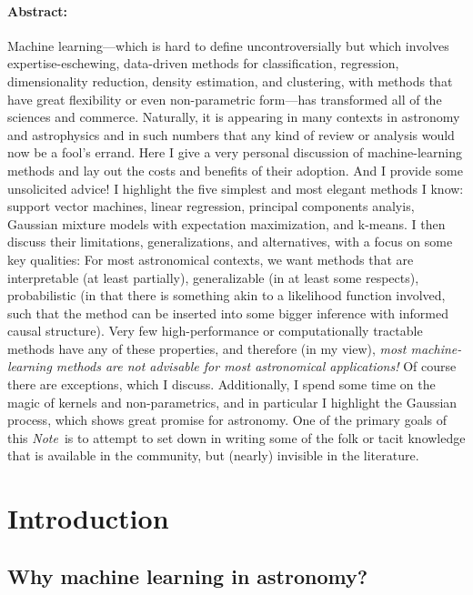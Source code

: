 \documentclass[12pt, twoside, letterpaper]{article}
\newcommand{\documentname}{\textsl{Note}}
\begin{document}
\paragraph{Abstract:}
Machine learning---which is hard to define uncontroversially
but which involves expertise-eschewing, data-driven methods for classification,
regression, dimensionality reduction, density estimation, and clustering,
with methods that have great flexibility or even non-parametric form---has transformed all
of the sciences and commerce.
Naturally, it is appearing in many contexts in astronomy and astrophysics and
in such numbers that any kind of review or analysis would now be a fool's errand.
Here I give a very personal discussion of machine-learning methods and lay out the costs and
benefits of their adoption.
And I provide some unsolicited advice!
I highlight the five simplest and most elegant methods I know: support vector
machines, linear regression, principal components analyis, Gaussian mixture models
with expectation maximization, and k-means.
I then discuss their limitations, generalizations, and alternatives, with a focus
on some key qualities:
For most astronomical contexts, we want methods that are interpretable (at least
partially), generalizable (in at least some respects), probabilistic (in that
there is something akin to a likelihood function involved, such that the method can
be inserted into some bigger inference with informed causal structure).
Very few high-performance or computationally tractable methods have any of these
properties, and therefore (in my view),
\emph{most machine-learning methods are not advisable for most astronomical
applications!}
Of course there are exceptions, which I discuss.
Additionally, I spend some time on the magic of kernels and non-parametrics, and in particular
I highlight the Gaussian process, which shows great promise for astronomy.
One of the primary goals of this \documentname\ is to attempt to set down in writing
some of the folk or tacit knowledge that is available in the community, but
(nearly) invisible in the literature.

\clearpage\section{Introduction}

\subsection{Why machine learning in astronomy?}
\end{document}
